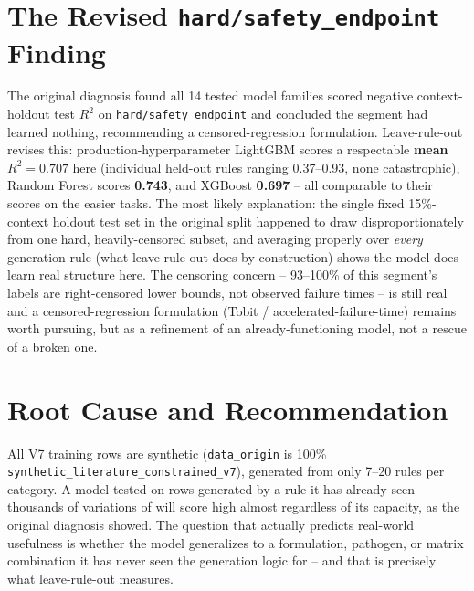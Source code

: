 \documentclass[11pt]{article}
\begin{document}
\section{The Revised \texttt{hard/safety\_endpoint} Finding}
The original diagnosis found all 14 tested model families scored negative
context-holdout test $R^2$ on \texttt{hard/safety\_endpoint} and concluded
the segment had learned nothing, recommending a censored-regression
formulation. Leave-rule-out revises this: production-hyperparameter
LightGBM scores a respectable \textbf{mean $R^2{=}0.707$} here (individual
held-out rules ranging 0.37--0.93, none catastrophic), Random Forest scores
\textbf{0.743}, and XGBoost \textbf{0.697} -- all comparable to their
scores on the easier tasks. The most likely explanation: the single fixed
15\%-context holdout test set in the original split happened to draw
disproportionately from one hard, heavily-censored subset, and averaging
properly over \emph{every} generation rule (what leave-rule-out does by
construction) shows the model does learn real structure here. The
censoring concern -- 93--100\% of this segment's labels are right-censored
lower bounds, not observed failure times -- is still real and a
censored-regression formulation (Tobit / accelerated-failure-time) remains
worth pursuing, but as a refinement of an already-functioning model, not a
rescue of a broken one.

\section{Root Cause and Recommendation}
All V7 training rows are synthetic (\texttt{data\_origin} is 100\%
\texttt{synthetic\_literature\_constrained\_v7}), generated from only
7--20 rules per category. A model tested on rows generated by a rule it
has already seen thousands of variations of will score high almost
regardless of its capacity, as the original diagnosis showed. The question
that actually predicts real-world usefulness is whether the model
generalizes to a formulation, pathogen, or matrix combination it has never
seen the generation logic for -- and that is precisely what leave-rule-out
measures.
\end{document}
